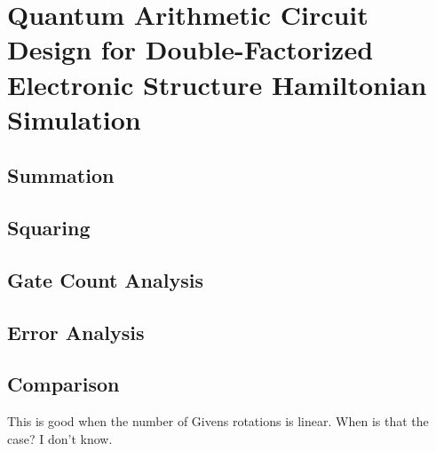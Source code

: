 

\chapter{Quantum Arithmetic Circuit Design for Double-Factorized Electronic Structure Hamiltonian Simulation}

\section{Summation}
\section{Squaring}
\section{Gate Count Analysis}
\section{Error Analysis}
\section{Comparison}

This is good when the number of Givens rotations is linear. When is that the case? I don't know.



